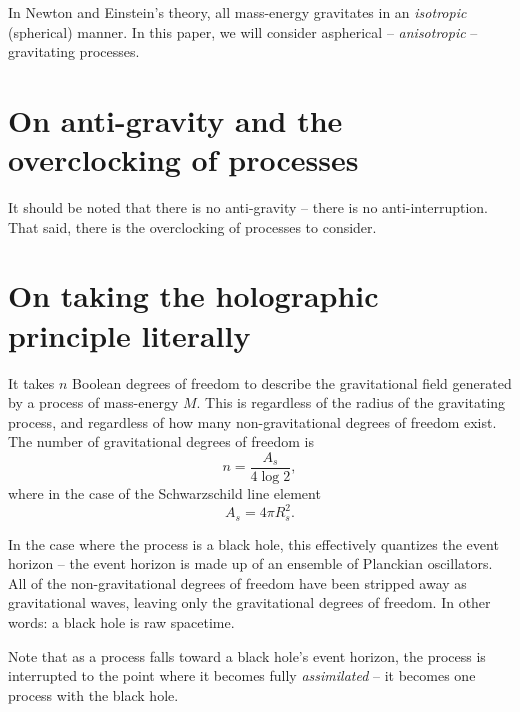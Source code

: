 \documentclass[12pt]{article}
\begin{document}
In Newton and Einstein's theory, all mass-energy gravitates in an {\textit{isotropic}} (spherical) manner.
In this paper, we will consider aspherical -- {\textit{anisotropic}} -- gravitating processes.







\section{On anti-gravity and the overclocking of processes}

It should be noted that there is no anti-gravity -- there is no anti-interruption.
That said, there is the overclocking of processes to consider.








\section{On taking the holographic principle literally}

It takes $n$ Boolean degrees of freedom to describe the gravitational field \cite{hooft, susskind, bousso} generated by a process of mass-energy $M$.
This is regardless of the radius of the gravitating process, and regardless of how many non-gravitational degrees of freedom exist.
The number of gravitational degrees of freedom is
\begin{equation}
n = \frac{A_s}{4 \log 2},
\end{equation}
where in the case of the Schwarzschild line element
\begin{equation}
A_s = 4 \pi R_s^2.
\end{equation}

In the case where the process is a black hole, this effectively quantizes the event horizon -- the event horizon is made up of an ensemble of Planckian oscillators.
All of the non-gravitational degrees of freedom have been stripped away as gravitational waves, leaving only the gravitational degrees of freedom.
In other words: a black hole is raw spacetime.

Note that as a process falls toward a black hole's event horizon, the process is interrupted to the point where it becomes fully {\textit{assimilated}} -- it becomes one process with the black hole.
\end{document}
